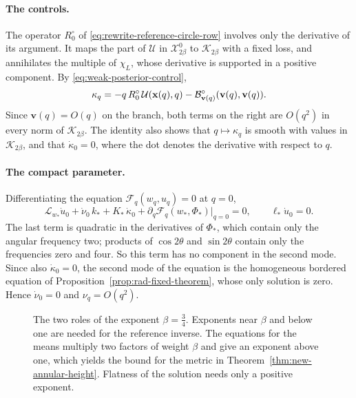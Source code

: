 \paragraph{The controls.}
The operator $R_0^\circ$ of
\eqref{eq:rewrite-reference-circle-row} involves only the derivative
of its argument. It maps the part of $\mathcal U$ in
$\mathcal X^0_{2\beta}$ to $\mathcal K_{2\beta}$ with a fixed loss,
and annihilates the multiple of $\chi_L$, whose derivative is
supported in a positive component. By
\eqref{eq:weak-posterior-control},
\begin{equation}\label{eq:rewrite-control-recovery}
 \kappa_q=-q\,R_0^\circ\,\mathcal U(\mathbf x(q),q)
            -\mathcal B^\circ_{\mathbf v(q)}(\mathbf v(q),\mathbf v(q)) .
\end{equation}
Since $\mathbf v(q)=O(q)$ on the branch, both terms on the right are
$O(q^2)$ in every norm of $\mathcal K_{2\beta}$. The identity also
shows that $q\mapsto\kappa_q$ is smooth with values in
$\mathcal K_{2\beta}$, and that $\dot\kappa_0=0$, where the dot
denotes the derivative with respect to $q$.

\paragraph{The compact parameter.}
Differentiating the equation $\mathcal F_q(w_q,u_q)=0$ at $q=0$,
\[
 \mathscr L_{w_*}\dot u_0+\dot\nu_0\,k_*+K_*\,\dot\kappa_0
       +\partial_q\mathcal F_q(w_*,\Phi_*)\big|_{q=0}=0,
 \qquad \ell_*\dot u_0=0 .
\]
The last term is quadratic in the derivatives of $\Phi_*$, which
contain only the angular frequency two; products of $\cos2\theta$ and
$\sin2\theta$ contain only the frequencies zero and four. So this
term has no component in the second mode. Since also
$\dot\kappa_0=0$, the second mode of the equation is the homogeneous
bordered equation of Proposition~\ref{prop:rad-fixed-theorem}, whose
only solution is zero. Hence $\dot\nu_0=0$ and $\nu_q=O(q^2)$.

\begin{figure}[htbp]
\centering
{}
\caption{The two roles of the exponent $\beta=\tfrac34$. Exponents
near $\beta$ and below one are needed for the reference inverse. The
equations for the means multiply two factors of weight $\beta$ and
give an exponent above one, which yields the bound for the metric in
Theorem~\ref{thm:new-annular-height}. Flatness of the solution needs
only a positive exponent.}
\label{fig:exponent-gain}
\end{figure}


